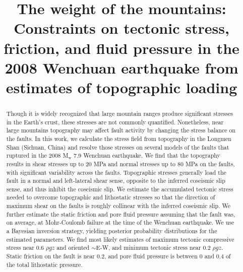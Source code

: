 \documentclass[draft,jgrga]{AGUTeX}
\begin{document}
\title{The weight of the mountains: Constraints on tectonic stress, friction,
       and fluid pressure in the 2008 Wenchuan earthquake from estimates of 
       topographic loading}






\begin{abstract}
Though it is widely recognized that large mountain ranges produce significant
stresses in the Earth's crust, these stresses are not commonly quantified.
Nonetheless, near large mountains topography may affect fault activity by
changing the stress balance on the faults. In this work, we calculate the
stress field from topography in the Longmen Shan (Sichuan, China) and resolve
those stresses on several models of the faults that ruptured in the 2008
M$_\mathrm{w}$ 7.9 Wenchuan earthquake. We find that the topography results in
shear stresses up to 20 MPa and normal stresses up to 80 MPa on the faults,
with significant variability across the faults. Topographic stresses generally
load the fault in a normal and left-lateral shear sense, opposite to the
inferred coseismic slip sense, and thus inhibit the coseismic slip. We estimate
the accumulated tectonic stress needed to overcome topographic and lithostatic
stresses so that the direction of maximum shear on the faults is roughly
collinear with the inferred coseismic slip. We further estimate the static
friction and pore fluid pressure assuming that the fault was, on average, at
Mohr-Coulomb failure at the time of the Wenchuan earthquake. We use a Bayesian
inversion strategy, yielding posterior probability distributions for the
estimated parameters. We find most likely estimates of maximum tectonic
compressive stress near 0.6 $\rho g z$ and oriented $\sim$E-W, and minimum
tectonic stress near 0.2 $\rho g z$. Static friction on the fault is near 0.2,
and pore fluid pressure is between 0 and 0.4 of the total lithostatic
pressure.  \end{abstract}
\end{document}
